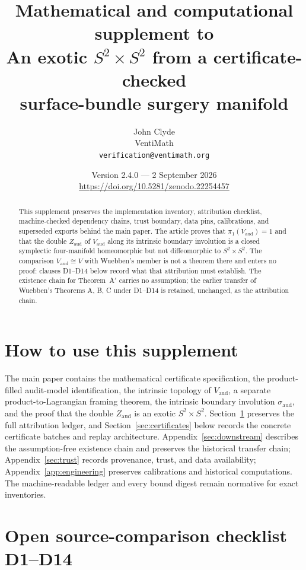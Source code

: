 \documentclass[11pt]{article}
\title{Mathematical and computational supplement to\\
An exotic $S^2\times S^2$ from a certificate-checked\\
surface-bundle surgery manifold}
\author{John Clyde\\ \small VentiMath\\
\small \texttt{verification@ventimath.org}}
\date{Version 2.4.0 --- 2 September 2026\\
\small \url{https://doi.org/10.5281/zenodo.22254457}}
\newcommand{\pione}{\pi_1}
\theoremstyle{definition}
\begin{document}
\renewcommand{\thetable}{S\arabic{table}}
\maketitle

\begin{abstract}
This supplement preserves the implementation inventory, attribution
checklist, machine-checked dependency chains, trust boundary, data pins,
calibrations, and superseded exports behind the main paper.  The article
proves that $\pione(V_{\mathrm{aud}})=1$ and that the double
$Z_{\mathrm{aud}}$ of $V_{\mathrm{aud}}$ along its intrinsic boundary
involution is a closed symplectic four-manifold homeomorphic but not
diffeomorphic to $S^2\times S^2$.  The comparison $V_{\mathrm{aud}}\cong V$
with Wuebben's member is not a theorem there and enters no proof: clauses
D1--D14 below record what that attribution must establish.  The existence
chain for Theorem~A$'$ carries no assumption; the earlier transfer of
Wuebben's Theorems A, B, C under D1--D14 is retained, unchanged, as the
attribution chain.
\end{abstract}

\section*{How to use this supplement}
The main paper contains the mathematical certificate specification, the
product-filled audit-model identification, the intrinsic topology of
$V_{\mathrm{aud}}$, a separate product-to-Lagrangian framing theorem, the
intrinsic boundary involution $\sigma_{\mathrm{aud}}$, and the proof that
the double $Z_{\mathrm{aud}}$ is an exotic $S^2\times S^2$.
Section~\ref{sec:detailed-boundaries} preserves the full attribution
ledger, and Section~\ref{sec:certificates}
below records the concrete certificate batches and replay architecture.
Appendix~\ref{sec:downstream} describes the assumption-free existence chain
and preserves the historical transfer chain; Appendix~\ref{sec:trust}
records provenance, trust, and data availability; Appendix~\ref{app:engineering}
preserves calibrations and historical computations.  The machine-readable
ledger and every bound digest remain normative for exact inventories.

\section{Open source-comparison checklist D1--D14}
\label{sec:detailed-boundaries}
\end{document}
